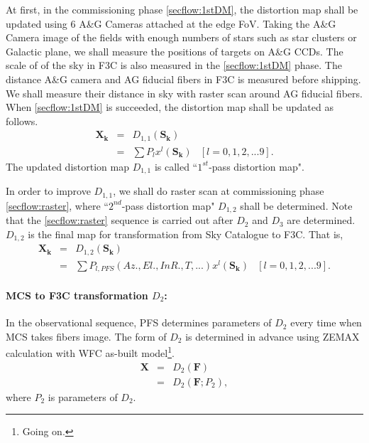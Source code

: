 \bigskip

At first, in the commissioning phase \ref{secflow:1stDM}, the distortion map shall be updated using 6 A\&G Cameras attached at the edge FoV. 
Taking the A\&G Camera image of the fields with enough numbers of stars such as star clusters or Galactic plane, we shall measure the positions of targets on A\&G CCDs.
The scale of of the sky in F3C is also measured in the \ref{secflow:1stDM} phase.
The distance A\&G camera and AG fiducial fibers in F3C is measured before shipping.
We shall measure their distance in sky with raster scan around AG fiducial fibers.
When \ref{secflow:1stDM} is succeeded, the distortion map shall be updated as follows.
\begin{equation}
\begin{array}{cclc}
\bm{X_k} & = & D_{1,1} (\bm{S_k}) \\
& = & \sum P_l x^l (\bm{S_k}) & [l=0,1,2, ... 9].
\end{array}
\end{equation}
The updated distortion map $D_{1,1}$ is called ``$1^{st}$-pass distortion map".


In order to improve $D_{1,1}$, we shall do raster scan at commissioning phase \ref{secflow:raster}, where ``$2^{nd}$-pass distortion map" $D_{1,2}$ shall be determined.
Note that the \ref{secflow:raster} sequence is carried out after $D_2$ and $D_3$ are determined.
$D_{1,2}$ is the final map for transformation from Sky Catalogue to F3C. 
That is, 
\begin{equation}
\begin{array}{cclc}
\bm{X_k} & = & D_{1,2} (\bm{S_k}) \\
& = & \sum P_{l,PFS}(Az., El., InR., T, ...) x^l (\bm{S_k}) & [l=0,1,2, ... 9].
\end{array}
\end{equation}


\paragraph{MCS to F3C transformation $D_2$:}
In the observational sequence, PFS determines parameters of $D_2$ every time when MCS takes fibers image.
The form of $D_2$ is determined in advance using ZEMAX calculation with WFC as-built model\footnote{Going on.}.
\begin{equation}
\begin{array}{ccl}
\bm{X} & = & D_{2} (\bm{F}) \\
& = & D_2(\bm{F}; P_{2}),
\end{array}
\end{equation}
where $P_2$ is parameters of $D_2$.

